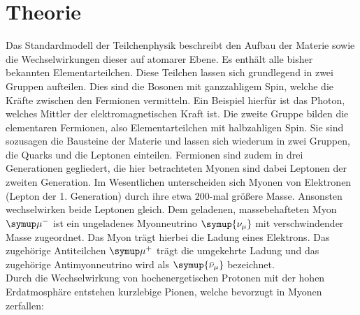 \section{Theorie}
\label{sec:Theorie}
Das Standardmodell der Teilchenphysik beschreibt den Aufbau der Materie sowie die Wechselwirkungen dieser auf atomarer Ebene.
Es enthält alle bisher bekannten Elementarteilchen. Diese Teilchen lassen sich grundlegend in zwei Gruppen aufteilen.
Dies sind die Bosonen mit ganzzahligem Spin, welche die Kräfte zwischen den Fermionen vermitteln. Ein Beispiel hierfür ist das Photon, welches Mittler der elektromagnetischen Kraft ist.
Die zweite Gruppe bilden die elementaren Fermionen, also Elementarteilchen mit halbzahligen Spin. Sie sind sozusagen die Bausteine der Materie und lassen sich wiederum in zwei Gruppen, die Quarks und die Leptonen einteilen.
Fermionen sind zudem in drei Generationen gegliedert, die hier betrachteten Myonen sind dabei Leptonen der zweiten Generation.
Im Wesentlichen unterscheiden sich Myonen von Elektronen (Lepton der 1. Generation) durch ihre etwa $200$-mal größere Masse. Ansonsten wechselwirken beide Leptonen gleich.
Dem geladenen, massebehafteten Myon $\symup\mu^-$ ist ein ungeladenes Myonneutrino $\symup{\nu_{\mu}}$ mit verschwindender Masse zugeordnet. Das Myon trägt hierbei die Ladung eines Elektrons. Das zugehörige Antiteilchen $\symup\mu^+$ trägt die umgekehrte Ladung und das zugehörige Antimyonneutrino wird als $\symup{\bar{\nu}_{\mu}}$ bezeichnet.
\\
Durch die Wechselwirkung von hochenergetischen Protonen mit der hohen Erdatmosphäre entstehen kurzlebige Pionen, welche bevorzugt in Myonen zerfallen:

